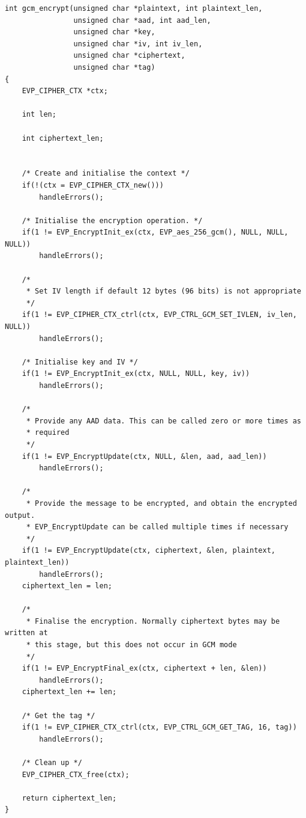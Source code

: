 \documentclass{article}
\begin{document}
\begin{lstlisting}
int gcm_encrypt(unsigned char *plaintext, int plaintext_len,
                unsigned char *aad, int aad_len,
                unsigned char *key,
                unsigned char *iv, int iv_len,
                unsigned char *ciphertext,
                unsigned char *tag)
{
    EVP_CIPHER_CTX *ctx;

    int len;

    int ciphertext_len;


    /* Create and initialise the context */
    if(!(ctx = EVP_CIPHER_CTX_new()))
        handleErrors();

    /* Initialise the encryption operation. */
    if(1 != EVP_EncryptInit_ex(ctx, EVP_aes_256_gcm(), NULL, NULL, NULL))
        handleErrors();

    /*
     * Set IV length if default 12 bytes (96 bits) is not appropriate
     */
    if(1 != EVP_CIPHER_CTX_ctrl(ctx, EVP_CTRL_GCM_SET_IVLEN, iv_len, NULL))
        handleErrors();

    /* Initialise key and IV */
    if(1 != EVP_EncryptInit_ex(ctx, NULL, NULL, key, iv))
        handleErrors();

    /*
     * Provide any AAD data. This can be called zero or more times as
     * required
     */
    if(1 != EVP_EncryptUpdate(ctx, NULL, &len, aad, aad_len))
        handleErrors();

    /*
     * Provide the message to be encrypted, and obtain the encrypted output.
     * EVP_EncryptUpdate can be called multiple times if necessary
     */
    if(1 != EVP_EncryptUpdate(ctx, ciphertext, &len, plaintext, plaintext_len))
        handleErrors();
    ciphertext_len = len;

    /*
     * Finalise the encryption. Normally ciphertext bytes may be written at
     * this stage, but this does not occur in GCM mode
     */
    if(1 != EVP_EncryptFinal_ex(ctx, ciphertext + len, &len))
        handleErrors();
    ciphertext_len += len;

    /* Get the tag */
    if(1 != EVP_CIPHER_CTX_ctrl(ctx, EVP_CTRL_GCM_GET_TAG, 16, tag))
        handleErrors();

    /* Clean up */
    EVP_CIPHER_CTX_free(ctx);

    return ciphertext_len;
}
\end{lstlisting}
\end{document}
